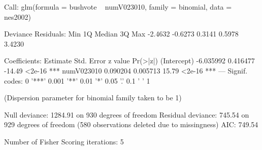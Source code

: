 \begin{Schunk}
\begin{Soutput}
Call:
glm(formula = bushvote ~ numV023010, family = binomial, data = nes2002)

Deviance Residuals: 
    Min       1Q   Median       3Q      Max  
-2.4632  -0.6273   0.3141   0.5978   3.4230  

Coefficients:
             Estimate Std. Error z value Pr(>|z|)    
(Intercept) -6.035992   0.416477  -14.49   <2e-16 ***
numV023010   0.090204   0.005713   15.79   <2e-16 ***
---
Signif. codes:  0 '***' 0.001 '**' 0.01 '*' 0.05 '.' 0.1 ' ' 1

(Dispersion parameter for binomial family taken to be 1)

    Null deviance: 1284.91  on 930  degrees of freedom
Residual deviance:  745.54  on 929  degrees of freedom
  (580 observations deleted due to missingness)
AIC: 749.54

Number of Fisher Scoring iterations: 5
\end{Soutput}
\end{Schunk}
